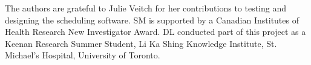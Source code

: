 The authors are grateful to Julie Veitch for her contributions to testing and designing the scheduling software. SM is supported by a Canadian Institutes of Health Research New Investigator Award. DL conducted part of this project as a Keenan Research Summer Student, Li Ka Shing Knowledge Institute, St. Michael's Hospital, University of Toronto.
